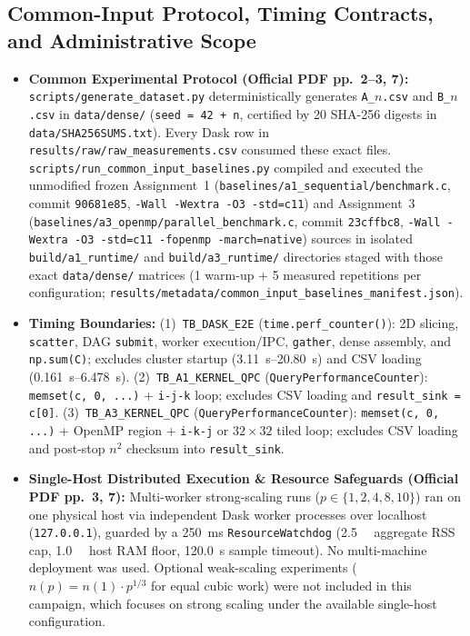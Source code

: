 \documentclass[11pt,a4paper]{article}
\begin{document}
\subsection{Common-Input Protocol, Timing Contracts, and Administrative Scope}
\begin{itemize}
    \item \textbf{Common Experimental Protocol (Official PDF pp.~2--3, 7):} \nolinkurl{scripts/generate_dataset.py} deterministically generates \texttt{A\_}$n$\texttt{.csv} and \texttt{B\_}$n$\texttt{.csv} in \nolinkurl{data/dense/} (\texttt{seed = 42 + n}, certified by 20 SHA-256 digests in \nolinkurl{data/SHA256SUMS.txt}). Every Dask row in \nolinkurl{results/raw/raw_measurements.csv} consumed these exact files. \nolinkurl{scripts/run_common_input_baselines.py} compiled and executed the unmodified frozen Assignment~1 (\nolinkurl{baselines/a1_sequential/benchmark.c}, commit \texttt{90681e85}, \texttt{-Wall -Wextra -O3 -std=c11}) and Assignment~3 (\nolinkurl{baselines/a3_openmp/parallel_benchmark.c}, commit \texttt{23cffbc8}, \texttt{-Wall -Wextra -O3 -std=c11 -fopenmp -march=native}) sources in isolated \nolinkurl{build/a1_runtime/} and \nolinkurl{build/a3_runtime/} directories staged with those exact \nolinkurl{data/dense/} matrices (1 warm-up + 5 measured repetitions per configuration; \nolinkurl{results/metadata/common_input_baselines_manifest.json}).
    \item \textbf{Timing Boundaries:} (1)~\texttt{TB\_DASK\_E2E} (\texttt{time.perf\_counter()}): 2D slicing, \texttt{scatter}, DAG \texttt{submit}, worker execution/IPC, \texttt{gather}, dense assembly, and \texttt{np.sum(C)}; excludes cluster startup (\SIrange{3.11}{20.80}{\second}) and CSV loading (\SIrange{0.161}{6.478}{\second}). (2)~\texttt{TB\_A1\_KERNEL\_QPC} (\texttt{QueryPerformanceCounter}): \texttt{memset(c, 0, ...)} + \texttt{i-j-k} loop; excludes CSV loading and \texttt{result\_sink = c[0]}. (3)~\texttt{TB\_A3\_KERNEL\_QPC} (\texttt{QueryPerformanceCounter}): \texttt{memset(c, 0, ...)} + OpenMP region + \texttt{i-k-j} or $32 \times 32$ tiled loop; excludes CSV loading and post-stop $n^2$ checksum into \texttt{result\_sink}.
    \item \textbf{Single-Host Distributed Execution \& Resource Safeguards (Official PDF pp.~3, 7):} Multi-worker strong-scaling runs ($p \in \{1, 2, 4, 8, 10\}$) ran on one physical host via independent Dask worker processes over localhost (\texttt{127.0.0.1}), guarded by a \SI{250}{\milli\second} \texttt{ResourceWatchdog} (\SI{2.5}{\gibi\byte} aggregate RSS cap, \SI{1.0}{\gibi\byte} host RAM floor, \SI{120.0}{\second} sample timeout). No multi-machine deployment was used. Optional weak-scaling experiments ($n(p)=n(1)\cdot p^{1/3}$ for equal cubic work) were not included in this campaign, which focuses on strong scaling under the available single-host configuration.
\end{itemize}
\end{document}
